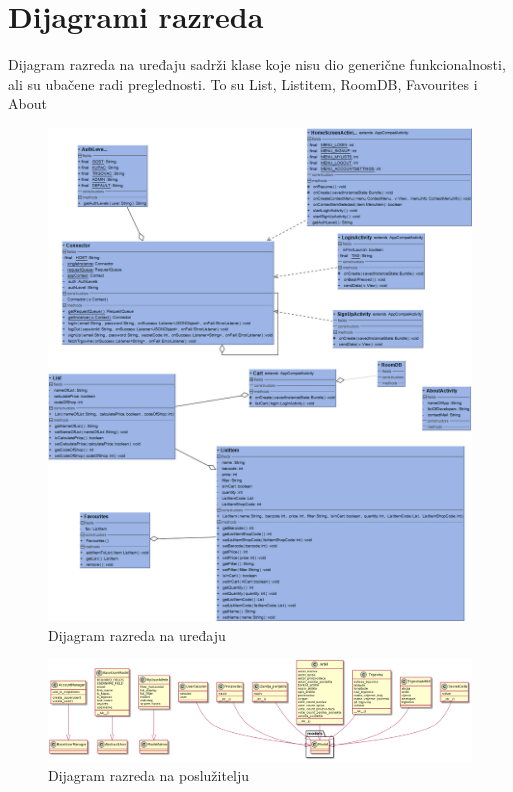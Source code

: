 			\eject
			
			
		\section{Dijagrami razreda}
		
		Dijagram razreda na uređaju sadrži klase koje nisu dio generične funkcionalnosti, ali su ubačene radi preglednosti. To su List, Listitem, RoomDB, Favourites i About
		
		\begin{figure}[H]
		    \centering
			\includegraphics[scale=0.4]{dijagrami/class_uredaj.png}
			\caption{Dijagram razreda na uređaju}
			\label{fig:class_uredaj}
		\end{figure}
		
		
		
		\begin{figure}[H]
		    \centering
			\includegraphics[width=1.0\linewidth]{dijagrami/class_posluzitelj.png}
			\caption{Dijagram razreda na poslužitelju}
			\label{fig:class_posluzitelj}
		\end{figure}
			
			
			
			\eject

